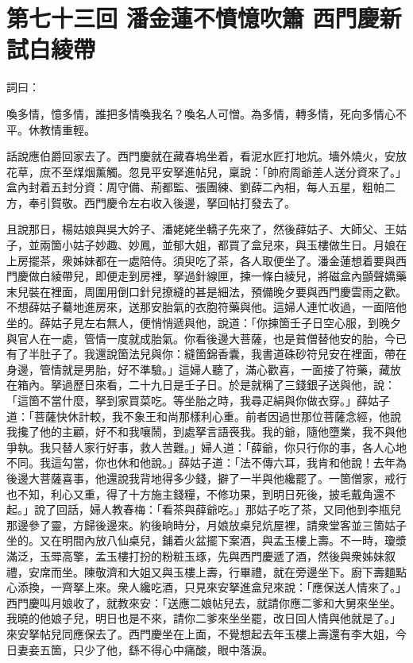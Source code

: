 
\chapter*{第七十三回 潘金蓮不憤憶吹簫 西門慶新試白綾帶}


詞曰：

\begin{myquote}
喚多情，憶多情，誰把多情喚我名？喚名人可憎。為多情，轉多情，死向多情心不平。休教情重輕。

\end{myquote}

話說應伯爵回家去了。西門慶就在藏春塢坐着，看泥水匠打地炕。墻外燒火，安放花草，庶不至煤烟薰觸。忽見平安拏進帖兒，稟說：「帥府周爺差人送分資來了。」盒內封着五封分資：周守備、荊都監、張團練、劉薛二內相，每人五星，粗帕二方，奉引賀敬。西門慶令左右收入後邊，拏回帖打發去了。

且說那日，楊姑娘與吳大妗子、潘姥姥坐轎子先來了，然後薛姑子、大師父、王姑子，並兩箇小姑子妙趣、妙鳳，並郁大姐，都買了盒兒來，與玉樓做生日。月娘在上房擺茶，衆姊妹都在一處陪侍。須臾吃了茶，各人取便坐了。潘金蓮想着要與西門慶做白綾帶兒，即便走到房裡，拏過針線匣，揀一條白綾兒，將磁盒內顫聲嬌藥末兒裝在裡面，周圍用倒口針兒撩縫的甚是細法，預備晚夕要與西門慶雲雨之歡。不想薛姑子驀地進房來，送那安胎氣的衣胞符藥與他。這婦人連忙收過，一面陪他坐的。薛姑子見左右無人，便悄悄遞與他，{}說道：「你揀箇壬子日空心服，到晚夕與官人在一處，管情一度就成胎氣。你看後邊大菩薩，也是貧僧替他安的胎，今已有了半肚子了。我還說箇法兒與你：縫箇錦香囊，我書道硃砂符兒安在裡面，帶在身邊，管情就是男胎，好不準驗。」{}這婦人聽了，滿心歡喜，一面接了符藥，藏放在箱內。拏過歷日來看，二十九日是壬子日。於是就稱了三錢銀子送與他，說：「這箇不當什麼，拏到家買菜吃。等坐胎之時，我尋疋絹與你做衣穿。」薛姑子道：「菩薩快休計較，我不象王和尚那樣利心重。{}前者因過世那位菩薩念經，他說我攙了他的主顧，好不和我嚷鬧，到處拏言語䘮我。我的爺，隨他墮業，我不與他爭執。我只替人家行好事，救人苦難。」婦人道：「薛爺，你只行你的事，各人心地不同。我這勾當，你也休和他說。」薛姑子道：「法不傳六耳，我肯和他說！去年為後邊大菩薩喜事，他還說我背地得多少錢，擗了一半與他纔罷了。一箇僧家，戒行也不知，利心又重，得了十方施主錢糧，不修功果，到明日死後，披毛戴角還不起。」說了回話，婦人教春梅：「看茶與薛爺吃。」那姑子吃了茶，又同他到李瓶兒那邊參了靈，方歸後邊來。約後晌時分，月娘放桌兒炕屋裡，請衆堂客並三箇姑子坐的。又在明間內放八仙桌兒，鋪着火盆擺下案酒，與孟玉樓上壽。不一時，瓊漿滿泛，玉斝高擎，孟玉樓打扮的粉粧玉琢，先與西門慶遞了酒，然後與衆姊妹叙禮，安席而坐。陳敬濟和大姐又與玉樓上壽，行畢禮，就在旁邊坐下。廚下壽麵點心添換，一齊拏上來。衆人纔吃酒，只見來安拏進盒兒來說：「應保送人情來了。」西門慶叫月娘收了，就教來安：「送應二娘帖兒去，就請你應二爹和大舅來坐坐。我曉的他娘子兒，明日也是不來，請你二爹來坐坐罷，改日回人情與他就是了。」來安拏帖兒同應保去了。西門慶坐在上面，不覺想起去年玉樓上壽還有李大姐，今日妻妾五箇，只少了他，繇不得心中痛酸，眼中落淚。{}

